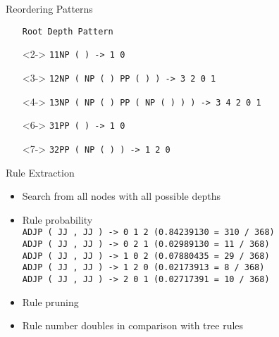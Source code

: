 \documentclass[18pt]{beamer}
\newcommand{\ul}[1]{{\color{red}{#1}}}
\begin{document}
\begin{frame}{Reordering Patterns}
\vspace{-0.2cm}
\begin{figure}
\centering

\end{figure}
\vspace{-0.6cm}
\begin{itemize}
\setlength{\itemsep}{0pt}
\setlength{\parskip}{0pt}
\setlength{\parsep}{0pt}
\scriptsize
\item[] \texttt{Root Depth Pattern}
\item[]<2-> \texttt{1\hphantom{xxxx}1\hphantom{xxxxx}NP ( \ul{NP$_0$} \ul{PP$_1$} ) -> 1 0}
\item[]<3-> \texttt{1\hphantom{xxxx}2\hphantom{xxxxx}NP ( NP ( \ul{JJ$_0$} \ul{NNS$_1$} ) PP ( \ul{IN$_2$} \ul{NP$_3$} ) ) -> 3 2 0 1}
\item[]<4-> \texttt{1\hphantom{xxxx}3\hphantom{xxxxx}NP ( NP ( \ul{JJ$_0$} \ul{NNS$_1$} ) PP ( \ul{IN$_2$} NP ( \ul{JJ$_3$} \ul{NNS$_4$} ) ) ) -> 3 4 2 0 1}
\item[]<6-> \texttt{3\hphantom{xxxx}1\hphantom{xxxxx}PP ( \ul{IN$_0$} \ul{NP$_1$} ) -> 1 0}
\item[]<7-> \texttt{3\hphantom{xxxx}2\hphantom{xxxxx}PP ( \ul{IN$_0$} NP ( \ul{JJ$_1$} \ul{NNS$_2$} ) ) -> 1 2 0}
\end{itemize}
\end{frame}

\begin{frame}{Rule Extraction}
\begin{itemize}[<+-| alert@+>]
\item Search from all nodes with all possible depths
\item Rule probability
\bigskip \\
\texttt{ADJP ( JJ , JJ ) -> 0 1 2 \hphantom{xx}  (0.84239130 = 310 / 368)}\\
\texttt{ADJP ( JJ , JJ ) -> 0 2 1 \hphantom{xx}  (0.02989130 = \hphantom{x}11 / 368)}\\
\texttt{ADJP ( JJ , JJ ) -> 1 0 2 \hphantom{xx}  (0.07880435 =  \hphantom{x}29 / 368)}\\
\texttt{ADJP ( JJ , JJ ) -> 1 2 0 \hphantom{xx}  (0.02173913 =  \hphantom{xx}8 / 368)}\\
\texttt{ADJP ( JJ , JJ ) -> 2 0 1 \hphantom{xx}  (0.02717391 =  \hphantom{x}10 / 368)} \bigskip \\
\item Rule pruning
\item Rule number doubles in comparison with tree rules
\end{itemize}
\end{frame}
\end{document}
